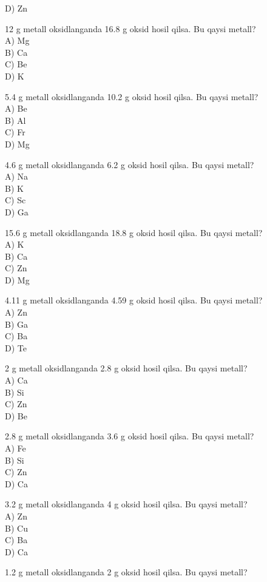 D) Zn
  \item 12 g metall oksidlanganda 16.8 g oksid hosil qilsa. Bu qaysi metall?\\
A) Mg\\
B) Ca\\
C) Be\\
D) K
  \item 5.4 g metall oksidlanganda 10.2 g oksid hosil qilsa. Bu qaysi metall?\\
A) Be\\
B) Al\\
C) Fr\\
D) Mg
  \item 4.6 g metall oksidlanganda 6.2 g oksid hosil qilsa. Bu qaysi metall?\\
A) Na\\
B) K\\
C) Sc\\
D) Ga
  \item 15.6 g metall oksidlanganda 18.8 g oksid hosil qilsa. Bu qaysi metall?\\
A) K\\
B) Ca\\
C) Zn\\
D) Mg
  \item 4.11 g metall oksidlanganda 4.59 g oksid hosil qilsa. Bu qaysi metall?\\
A) Zn\\
B) Ga\\
C) Ba\\
D) Te
  \item 2 g metall oksidlanganda 2.8 g oksid hosil qilsa. Bu qaysi metall?\\
A) Ca\\
B) Si\\
C) Zn\\
D) Be
  \item 2.8 g metall oksidlanganda 3.6 g oksid hosil qilsa. Bu qaysi metall?\\
A) Fe\\
B) Si\\
C) Zn\\
D) Ca
  \item 3.2 g metall oksidlanganda 4 g oksid hosil qilsa. Bu qaysi metall?\\
A) Zn\\
B) Cu\\
C) Ba\\
D) Ca
  \item 1.2 g metall oksidlanganda 2 g oksid hosil qilsa. Bu qaysi metall?\\
